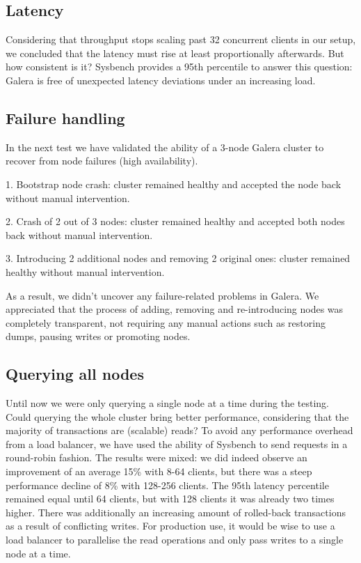 \documentclass{sig-alternate}
\begin{document}
\subsection{Latency}

Considering that throughput stops scaling past 32 concurrent clients in our setup, we concluded that the latency must rise at least proportionally afterwards. But how consistent is it? Sysbench provides a 95th percentile to answer this question: Galera is free of unexpected latency deviations under an increasing load.

\subsection{Failure handling}

In the next test we have validated the ability of a 3-node Galera cluster to recover from node failures (high availability).

1. Bootstrap node crash: cluster remained healthy and accepted the node back without manual intervention.

2. Crash of 2 out of 3 nodes: cluster remained healthy and accepted both nodes back without manual intervention.

3. Introducing 2 additional nodes and removing 2 original ones: cluster remained healthy without manual intervention.

As a result, we didn't uncover any failure-related problems in Galera. We appreciated that the process of adding, removing and re-introducing nodes was completely transparent, not requiring any manual actions such as restoring dumps, pausing writes or promoting nodes.

\subsection{Querying all nodes}

Until now we were only querying a single node at a time during the testing. Could querying the whole cluster bring better performance, considering that the majority of transactions are (scalable) reads? To avoid any performance overhead from a load balancer, we have used the ability of Sysbench to send requests in a round-robin fashion. The results were mixed: we did indeed observe an improvement of an average 15\% with 8-64 clients, but there was a steep performance decline of 8\% with 128-256 clients. The 95th latency percentile remained equal until 64 clients, but with 128 clients it was already two times higher. There was additionally an increasing amount of rolled-back transactions as a result of conflicting writes. For production use, it would be wise to use a load balancer to parallelise the read operations and only pass writes to a single node at a time.
\end{document}
